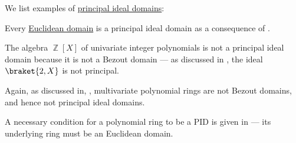 \begin{example}\label{ex:def:principal_ideal_domain}
  We list examples of \hyperref[def:principal_ideal_domain]{principal ideal domains}:
  \begin{thmenum}
     Every \hyperref[def:euclidean_domain]{Euclidean domain} is a principal ideal domain as a consequence of .

     The algebra \( \BbbZ[X] \) of univariate integer polynomials is not a principal ideal domain because it is not a Bezout domain --- as discussed in , the ideal \( \braket{ 2, X } \) is not principal.

     Again, as discussed in, , multivariate polynomial rings are not Bezout domains, and hence not principal ideal domains.

    A necessary condition for a polynomial ring to be a PID is given in  --- its underlying ring must be an Euclidean domain.
  \end{thmenum}
\end{example}

